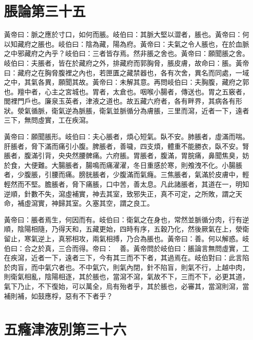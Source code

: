 \section{脹論第三十五}

黃帝曰：脈之應於寸口，如何而脹。岐伯曰：其脈大堅以澀者，脹也。黃帝曰：何以知藏府之脹也。岐伯曰：陰為藏，陽為府。黃帝曰：夫氣之令人脹也，在於血脈之中邪藏府之內乎？岐伯曰：三者皆存焉。然非脹之舍也。黃帝曰：願聞脹之舍。岐伯曰：夫脹者，皆在於藏府之外，排藏府而郭胸脅，脹皮膚，故命曰：脹。黃帝曰：藏府之在胸脅腹裡之內也，若匣匱之藏禁器也，各有次舍，異名而同處，一域之中，其氣各異，願聞其故。黃帝曰：未解其意。再問岐伯曰：夫胸腹，藏府之郭也。羶中者，心主之宮城也。胃者，太倉也。咽喉小腸者，傳送也。胃之五竅者，閭裡門戶也。廉泉玉英者，津液之道也。故五藏六府者，各有畔界，其病各有形狀。滎氣循脈，衛氣逆為脈脹，衛氣並脈循分為膚脹，三里而瀉，近者一下，遠者三下，無問虛實，工在疾瀉。

黃帝曰：願聞脹形。岐伯曰：夫心脹者，煩心短氣。臥不安。肺脹者，虛滿而喘。肝脹者，脅下滿而痛引小腹。脾脹者，善噦，四支煩，體重不能勝衣，臥不安。腎脹者，腹滿引背，央央然腰髀痛。六府脹。胃脹者，腹滿，胃脘痛，鼻聞焦臭，妨於食，大便難。大腸脹者，腸鳴而痛濯濯，冬日重感於寒，則飧洩不化。小腸脹者，少腹脹，引腰而痛。膀胱脹者，少腹滿而氣癃。三焦脹者，氣滿於皮膚中，輕輕然而不堅。膽脹者，脅下痛脹，口中苦，善太息。凡此諸脹者，其道在一，明知逆順，針數不失，瀉虛補實，神去其室，致邪失正，真不可定，之所敗，謂之天命，補虛瀉實，神歸其室。久塞其空，謂之良工。

黃帝曰：脹者焉生，何因而有。岐伯曰：衛氣之在身也，常然並脈循分肉，行有逆順，陰陽相隨，乃得天和，五藏更始，四時有序，五穀乃化，然後厥氣在上，滎衛留止，寒氣逆上，真邪相攻，兩氣相搏，乃合為脹也。黃帝曰：善。何以解惑。岐伯曰：合之於真，三合而得。帝曰：　善。黃帝問於岐伯曰：脹論言無問虛實，工在疾瀉，近者一下，遠者三下，今有其三而不下者，其過焉在。岐伯對曰：此言陷於肉盲，而中氣穴者也。不中氣穴，則氣內閉，針不陷盲，則氣不行，上越中肉，則衛氣相亂，陰陽相逐，其於脹也，當瀉不瀉，氣故不下，三而不下，必更其道，氣下乃止，不下復始，可以萬全，烏有殆者乎，其於脹也，必審其，當瀉則瀉，當補則補，如鼓應桴，惡有不下者乎？



\section{五癃津液別第三十六}


